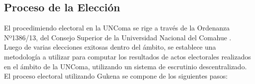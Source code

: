 \subsection{Proceso de la Elección}

El procedimiendo electoral en la UNComa se rige a través de la Ordenanza Nº1386/13, del Consejo Superior de la Universidad Nacional del Comahue \cite{ordenanzaUncoma}. Luego de varias elecciones exitosas dentro del ámbito, se establece una metodología a utilizar para computar los resultados de actos electorales realizados en el ámbito de la UNComa, utilizando un sistema de escrutinio descentralizado. \newline
El proceso electoral utilizando Gukena se compone de los siguientes pasos:
